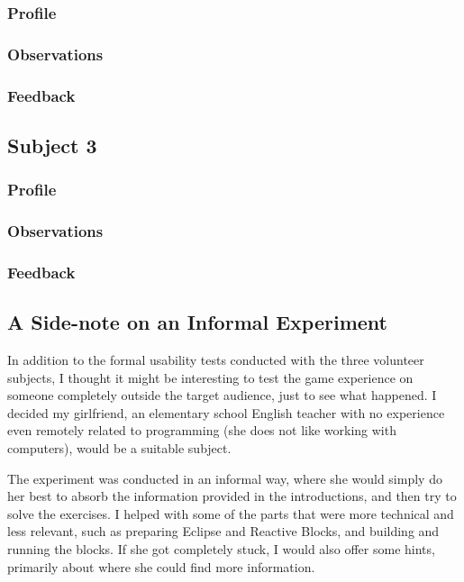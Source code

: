 \subsubsection{Profile}

\subsubsection{Observations}

\subsubsection{Feedback}


\subsection{Subject 3}
\label{sec:game_testing_subject3}


\subsubsection{Profile}

\subsubsection{Observations}

\subsubsection{Feedback}

\subsection{A Side-note on an Informal Experiment}
\label{sec:game_testing_sidenote}
In addition to the formal usability tests conducted with the three volunteer subjects, I thought it might be interesting to test the game experience on someone completely outside the target audience, just to see what happened. I decided my girlfriend, an elementary school English teacher with no experience even remotely related to programming (she does not like working with computers), would be a suitable subject.

\noindent
The experiment was conducted in an informal way, where she would simply do her best to absorb the information provided in the introductions, and then try to solve the exercises. I helped with some of the parts that were more technical and less relevant, such as preparing Eclipse and Reactive Blocks, and building and running the blocks. If she got completely stuck, I would also offer some hints, primarily about where she could find more information.

